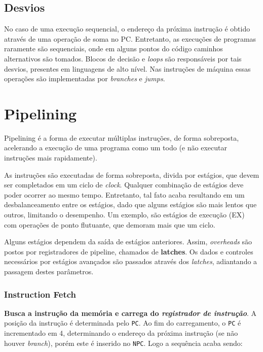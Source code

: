 \subsection{Desvios}
No caso de uma execução sequencial, o endereço da próxima instrução é obtido através de uma operação de soma no PC. Entretanto, as execuções de programas raramente são sequenciais, onde em alguns pontos do código caminhos alternativos são tomados. Blocos de decisão e \textit{loops} são responsáveis por tais desvios, presentes em linguagens de alto nível. Nas instruções de máquina essas operações são implementadas por \textit{branches} e \textit{jumps}.





\section{Pipelining}
Pipelining é a forma de executar múltiplas instruções, de forma sobreposta, acelerando a execução de uma programa como um todo (e não executar instruções mais rapidamente).

As instruções são executadas de forma sobreposta, divida por estágios, que devem ser completados em um ciclo de \textit{clock}. Qualquer combinação de estágios deve poder ocorrer ao mesmo tempo. Entretanto, tal fato acaba resultando em um desbalanceamento entre os estágios, dado que alguns estágios são mais lentos que outros, limitando o desempenho. Um exemplo, são estágios de execução (EX) com operações de ponto flutuante, que demoram mais que um ciclo.

Alguns estágios dependem da saída de estágios anteriores. Assim, \textit{overheads} são postos por registradores de pipeline, chamados de \textbf{latches}. Os dados e controles necessários por estágios avançados são passados através dos \textit{latches}, adiantando a passagem destes parâmetros.



\subsubsection*{Instruction Fetch}
\textbf{Busca a instrução da memória e carrega do \textit{registrador de instrução}}. A posição da instrução é determinada pelo \texttt{PC}. Ao fim do carregamento, o \texttt{PC} é incrementado em 4, determinando o endereço da próxima instrução (se não houver \textit{branch}), porém este é inserido no \texttt{NPC}. Logo a sequência acaba sendo:

